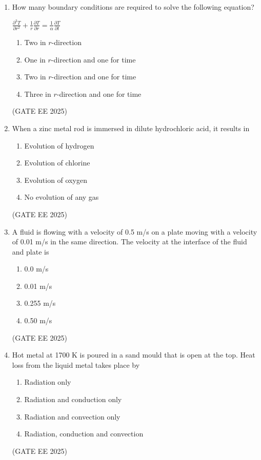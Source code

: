 \documentclass[11pt, letterpaper]{article}
\theoremstyle{remark}
\begin{document}
\begin{enumerate}
\item How many boundary conditions are required to solve the following equation?\\
\begin{center}
$\displaystyle \frac{\partial^2 T}{\partial r^2} 
+ \frac{1}{r} \frac{\partial T}{\partial r} 
= \frac{1}{\alpha} \frac{\partial T}{\partial t}$    
\end{center}

\begin{multicols}{2}
\begin{enumerate}  
\item Two in $r$-direction
\item One in $r$-direction and one for time
\item Two in $r$-direction and one for time
\item Three in $r$-direction and one for time
\end{enumerate}
\end{multicols}
\hfill(GATE EE 2025)
 

\item When a zinc metal rod is immersed in dilute hydrochloric acid, it results in 
\begin{multicols}{2}
\begin{enumerate}  
\item Evolution of hydrogen
\item Evolution of chlorine
\item Evolution of oxygen
\item No evolution of any gas
\end{enumerate}
\end{multicols}
\hfill(GATE EE 2025)

 

\item A fluid is flowing with a velocity of 0.5 m/s on a plate moving with a velocity of 0.01 m/s in the same direction. The velocity at the interface of the fluid and plate is  
\begin{multicols}{4}
\begin{enumerate}  
\item 0.0 m/s
\item 0.01 m/s
\item 0.255 m/s
\item 0.50 m/s
\end{enumerate}
\end{multicols}
\hfill(GATE EE 2025)
 

\item Hot metal at 1700 K is poured in a sand mould that is open at the top. Heat loss from the liquid metal takes place by 
\begin{multicols}{2}
\begin{enumerate}  
\item Radiation only
\item Radiation and conduction only
\item Radiation and convection only
\item Radiation, conduction and convection
\end{enumerate}
\end{multicols}
\hfill(GATE EE 2025)
 


\end{enumerate}
\end{document}
